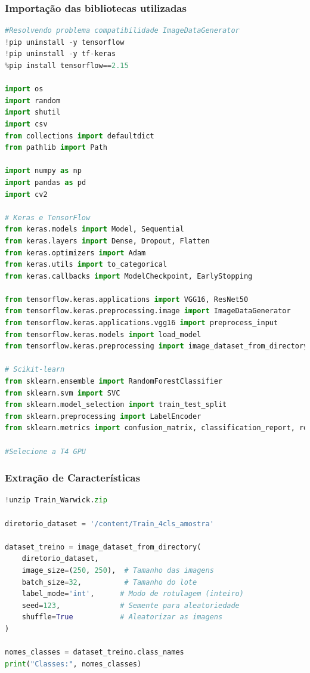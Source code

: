 \subsubsection*{Importação das bibliotecas utilizadas}
\begin{lstlisting}[language=Python, style=input]
#Resolvendo problema compatibilidade ImageDataGenerator
!pip uninstall -y tensorflow
!pip uninstall -y tf-keras
%pip install tensorflow==2.15

import os
import random
import shutil
import csv
from collections import defaultdict
from pathlib import Path

import numpy as np
import pandas as pd
import cv2

# Keras e TensorFlow
from keras.models import Model, Sequential
from keras.layers import Dense, Dropout, Flatten
from keras.optimizers import Adam
from keras.utils import to_categorical
from keras.callbacks import ModelCheckpoint, EarlyStopping

from tensorflow.keras.applications import VGG16, ResNet50
from tensorflow.keras.preprocessing.image import ImageDataGenerator
from tensorflow.keras.applications.vgg16 import preprocess_input
from tensorflow.keras.models import load_model
from tensorflow.keras.preprocessing import image_dataset_from_directory

# Scikit-learn
from sklearn.ensemble import RandomForestClassifier
from sklearn.svm import SVC
from sklearn.model_selection import train_test_split
from sklearn.preprocessing import LabelEncoder
from sklearn.metrics import confusion_matrix, classification_report, recall_score, precision_score, f1_score

#Selecione a T4 GPU
\end{lstlisting}


\subsubsection*{Extração de Características}

\begin{lstlisting}[language=Python, style=input]
!unzip Train_Warwick.zip

diretorio_dataset = '/content/Train_4cls_amostra'

dataset_treino = image_dataset_from_directory(
    diretorio_dataset,
    image_size=(250, 250),  # Tamanho das imagens
    batch_size=32,          # Tamanho do lote
    label_mode='int',      # Modo de rotulagem (inteiro)
    seed=123,              # Semente para aleatoriedade
    shuffle=True           # Aleatorizar as imagens
)

nomes_classes = dataset_treino.class_names
print("Classes:", nomes_classes)
\end{lstlisting}

